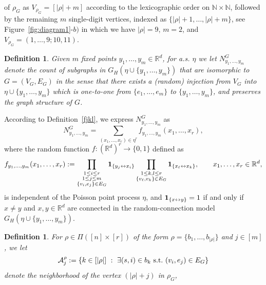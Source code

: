 \documentclass[12pt]{article}
\newcommand{\R}{\mathbb{R}}
\newcommand{\bone}{{\bf 1}}
\newcommand{\inte}{\mathbb{N}}
\newtheorem{definition}[prop]{Definition}
\def\real{{\mathord{\mathbb R}}}
\numberwithin{equation}{section}
\begin{document}
{of $\rho_G$  
as $V_{\rho_G}=[|\rho | + m ]$ according to the lexicographic order
on $\inte \times \inte$, 
followed by the remaining $m$ single-digit vertices, 
indexed as $\{|\rho |+1,\ldots , |\rho | +m\}$,
see Figure~\ref{fig:diagram1}-$b)$
in which we have $|\rho | =9$, $m = 2$, and $V_{\rho_G}=(1,\dots ,9;10, 11)$. 
\begin{definition}
    Given $m$ fixed points $y_1 , \ldots,y_m \in \R^d$,
    for a.s. $\eta$ we let $N_{y_1,\ldots , y_m}^G$ denote the count of subgraphs
   in $G_H (\eta \cup \{y_1,\ldots , y_m \} )$
   that are isomorphic to $G=(V_G,E_G)$ in the sense that 
   there exists a (random) injection
   from $V_G$ into $\eta \cup \{y_1,\ldots , y_m \}$
   which is one-to-one from $\{e_1,\ldots , e_m\}$ to $\{y_1,\ldots , y_m\}$, 
   and preserves the graph structure of $G$. 
  \end{definition}
  \noindent
   According to Definition~\ref{fjkl}, we express $N_{y_1,\ldots , y_m}^G$ as  
  \begin{equation}
  \nonumber
    N_{y_1,\ldots , y_m}^G=\sum_{(x_1, \ldots ,x_r)\in\eta^{r}}f_{y_1,\ldots , y_m} (x_1, \ldots ,x_r), 
  \end{equation}
  where the random
  function $f:(\real^d)^r \to \{0,1\}$ defined as 
  \begin{equation}
  \nonumber
  f_{y_1,\ldots , y_m} (x_1, \ldots ,x_r):=
  \prod_{
    \substack{
      1 \leq i \leq r
      \\
      1 \leq j \leq m
      \\ \{v_i,e_j\}\in E_G }
  }
  \bone_{\{y_j\leftrightarrow x_i\}} 
  \prod_{\substack{ 1 \leq k,l \leq r
      \\ \{v_\ell,v_k\}\in E_G}}\bone_{\{x_\ell\leftrightarrow x_k\}},
  \qquad
   x_1,\ldots , x_r \in \R^d, 
  \end{equation}
  is independent of the Poisson point process $\eta$,
   and $\bone_{\{x\leftrightarrow y\}}=1$ if and only if
  $x\neq y$ and $x,y\in \real^d$ are connected in the
   random-connection model 
   $G_H (\eta \cup \{y_1, \ldots ,y_m\})$.
   \begin{definition}
    For $\rho\in\Pi ([n]\times[r])$ of the form
    $\rho = \{ b_1,\ldots , b_{|\rho |}\}$ 
    and $j \in [m]$, we let 
  \begin{equation}
  \nonumber
      {\cal A}^\rho_j:=\{ k \in [ |\rho | ] \ : \ \exists (s,i)\in b_k ~\mathrm{s.t.}~
      (v_i,e_j) \in E_G %
      \} 
  \end{equation} 
  denote the neighborhood of the vertex $(|\rho | + j)$ in $\rho_G$,

\end{definition}}
\end{document}
